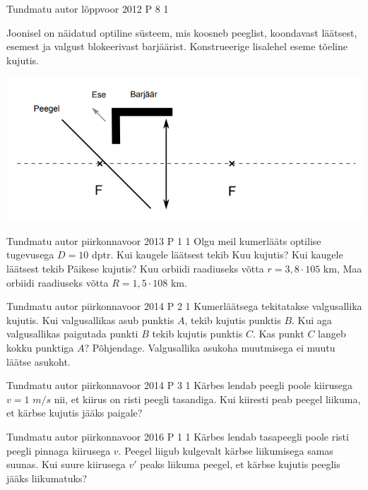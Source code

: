 \documentclass[11pt]{article}
\begin{document}
{%
{Tundmatu autor} %
{lõppvoor} %
{2012} %
{P 8} %
{1} %
{
\ifStatement
Joonisel on näidatud optiline süsteem, mis koosneb peeglist, koondavast läätsest, esemest ja valgust blokeerivast barjäärist. Konstrueerige lisalehel eseme tõeline kujutis.
\begin{center}
	\includegraphics[width=0.5\linewidth]{2012-v3p-08-yl.PNG}
\end{center}
\fi
}


{Tundmatu autor} %
{piirkonnavoor} %
{2013} %
{P 1} %
{1} %
{
\ifStatement
Olgu meil kumerlääts optilise tugevusega $D = 10$ dptr. Kui kaugele läätsest tekib Kuu kujutis? Kui kaugele läätsest tekib Päikese kujutis? Kuu orbiidi raadiuseks võtta $r = 3,8 \cdot 105$ km, Maa orbiidi raadiuseks võtta $R = 1,5 \cdot 108$ km.
\fi
}
 


{Tundmatu autor} %
{piirkonnavoor} %
{2014} %
{P 2} %
{1} %
{
\ifStatement
Kumerläätsega tekitatakse valgusallika kujutis. Kui valgusallikas asub punktis $A$, tekib kujutis punktis $B$. Kui aga valgusallikas paigutada punkti $B$ tekib kujutis punktis $C$. Kas punkt $C$ langeb kokku punktiga $A$? Põhjendage. Valgusallika asukoha muutmisega ei muutu läätse asukoht.
\fi
}


{Tundmatu autor} %
{piirkonnavoor} %
{2014} %
{P 3} %
{1} %
{
\ifStatement
Kärbes lendab peegli poole kiirusega $v = 1$ $m/s$ nii, et kiirus on risti peegli tasandiga. Kui kiiresti peab peegel liikuma, et kärbse kujutis jääks paigale?
\fi
}

{Tundmatu autor} %
{piirkonnavoor} %
{2016} %
{P 1} %
{1} %
{
\ifStatement
Kärbes lendab tasapeegli poole risti peegli pinnaga kiirusega $v$. Peegel liigub kulgevalt kärbse liikumisega samas suunas. Kui suure kiirusega $v'$ peaks liikuma peegel, et kärbse kujutis peeglis jääks liikumatuks?
\fi
}

}
\end{document}
